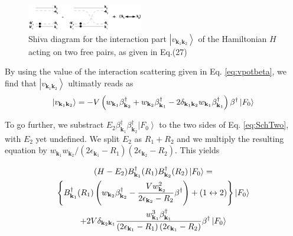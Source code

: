 \documentclass[aps,prb,superscriptaddress,twocolumn]{revtex4}
\begin{document}
\begin{figure}[htb]
   \includegraphics[width=0.45\textwidth]{twoPair.eps}
\caption{Shiva diagram for the interaction part $\left|v_{\mathbf{k} _1\mathbf{k} _2}\right>$ of the Hamiltonian $H$ acting on two free pairs, as given in Eq.(27)}
\label{fig:twoP}
\end{figure}

By using the value of the interaction scattering given in Eq.%
\eqref{eq:vpotbeta}, we find that $\left|v_{\mathbf{k} _1\mathbf{k}
_2}\right> $ ultimatly reads as
\begin{equation}
\left|v_{\mathbf{k} _1\mathbf{k} _2}\right> =-V\left(w_{\mathbf{k}
_1}\beta^{\dagger}_{\mathbf{k} _2}+w_{\mathbf{k} _2}\beta^{\dagger}_{\mathbf{%
k} _1}-2\delta_{\mathbf{k} _1\mathbf{k} _2}w_{\mathbf{k} _1}\beta^{\dagger}_{%
\mathbf{k} _1}\right) \beta^{\dagger}\left|F_0\right>  
\end{equation}

To go further, we substract $E _2\beta^{\dagger}_{\mathbf{k}
_1}\beta^{\dagger}_{\mathbf{k} _2}\left|F_0\right>  $ to the two sides of Eq.%
\eqref{eq:SchTwo}, with $E _2$ yet undefined. We split $E _2$ as $R_1+R_2$ and we multiply
the resulting equation by $w_{\mathbf{k} _1}w_{\mathbf{k} _2}/\left(2%
\epsilon_{\mathbf{k} _1}-R_1\right) \left(2\epsilon_{\mathbf{k}
_2}-R_2\right) $. This yields


\begin{multline}  \label{eq:SchTwo2}
(H-E _2)B^{\dagger}_{\mathbf{k} _1}(R_1)B^{\dagger}_{\mathbf{k}
_2}(R_2)\left|F_0\right>   = \\
\left\{B^{\dagger}_{\mathbf{k} _1}(R_1)\left(w_{\mathbf{k}
_2}\beta^{\dagger}_{\mathbf{k} _2}-\frac{Vw_{\mathbf{k} _2}^2}{2\epsilon_{%
\mathbf{k} _2}-R_2}\beta^{\dagger}\right)+(1\leftrightarrow2)\right\}
\left|F_0\right>  \\
+2V\delta_{{\mathbf{k} _2}{\mathbf{k} _1}}\frac{w^3_{{\mathbf{k} _1}}\beta^\dagger_{{\mathbf{k} _1}}}{\left(2%
\epsilon_{\mathbf{k} _1}-R_1\right) \left(2\epsilon_{\mathbf{k}
_1}-R_2\right)}\beta^\dagger\left|F_0\right>  
\end{multline}
\end{document}
